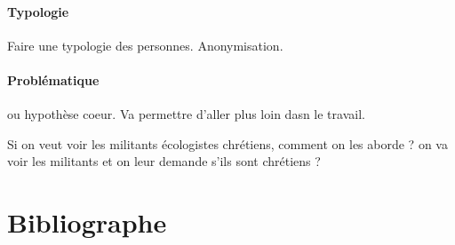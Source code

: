 \paragraph{Typologie}

Faire une typologie des personnes. Anonymisation. 


\paragraph{Problématique} ou hypothèse coeur. Va permettre d'aller plus loin dasn le travail. 

\begin{Ex}
Si on veut voir les militants écologistes chrétiens, comment on les aborde ? on va voir les militants et on leur demande s'ils sont chrétiens ?

\end{Ex}




\section{Bibliographe}

